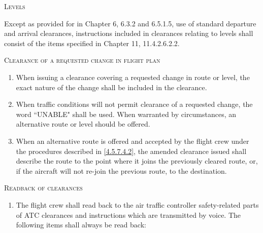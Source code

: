 \begin{enumeratesc}
    \item \textsc{Levels}
    \begin{enumempty}
        \item Except as provided for in Chapter 6, 6.3.2 and 6.5.1.5, use of standard departure and arrival clearances, instructions included in clearances relating to levels shall consist of the items specified in Chapter 11, 11.4.2.6.2.2.
    \end{enumempty}

    \item \textsc{Clearance of a requested change in flight plan}
    \begin{enumerate}
        \item When issuing a clearance covering a requested change in route or level, the exact nature of the change shall be included in the clearance.
        \item \label{4.5.7.4.2} When traffic conditions will not permit clearance of a requested change, the word ``UNABLE" shall be used. When warranted by circumstances, an alternative route or level should be offered.
        \item When an alternative route is offered and accepted by the flight crew under the procedures described in \ref{4.5.7.4.2}, the amended clearance issued shall describe the route to the point where it joins the previously cleared route, or, if the aircraft will not re-join the previous route, to the destination.
    \end{enumerate}

    \item \textsc{Readback of clearances}
    \begin{enumerate}
        \item The flight crew shall read back to the air traffic controller safety-related parts of ATC clearances and instructions which are transmitted by voice. The following items shall always be read back:


\end{enumerate}
\end{enumeratesc}
